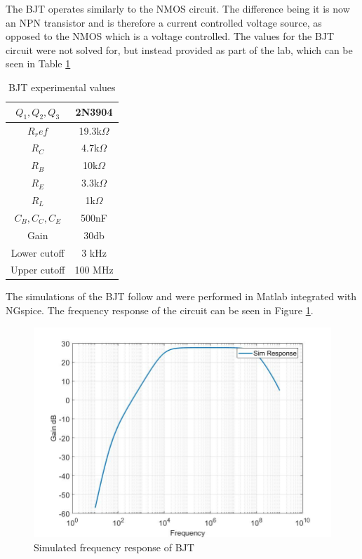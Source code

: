 
The BJT operates similarly to the NMOS circuit. The difference being it is now an NPN transistor and is therefore a current controlled voltage source, as opposed to the NMOS which is a voltage controlled. The values for the BJT circuit were not solved for, but instead provided as part of the lab, which can be seen in Table \ref{tab:bjttab}

\begin{table}[H]
	\centering
	\caption{BJT experimental values}
	\label{tab:bjttab}
	\begin{tabular}{cc}
		$Q_1, Q_2, Q_3$ & 2N3904        \\ \hline
		$R_ref$         & 19.3k$\Omega$ \\ \hline
		$R_C$           & 4.7k$\Omega$  \\ \hline
		$R_B$           & 10k$\Omega$   \\ \hline
		$R_E$           & 3.3k$\Omega$  \\ \hline
		$R_L$           & 1k$\Omega$    \\ \hline
		$C_B, C_C, C_E$ & 500nF         \\  \hline
		Gain            & 30db          \\  \hline
		Lower cutoff    & 3 kHz         \\  \hline
		Upper cutoff    & 100 MHz       \\  \hline  
	\end{tabular}
\end{table}

 The simulations of the BJT follow and were performed in Matlab integrated with NGspice. The frequency response of the circuit can be seen in Figure \ref{fig:bjtsimfreq}. 

\begin{figure}[H]
	\centering
	\includegraphics[width=.55\textwidth]{CircuitDevelopment/BJT_bandwidth.jpg}
	\caption{Simulated frequency response of BJT}
	\label{fig:bjtsimfreq}
\end{figure}

